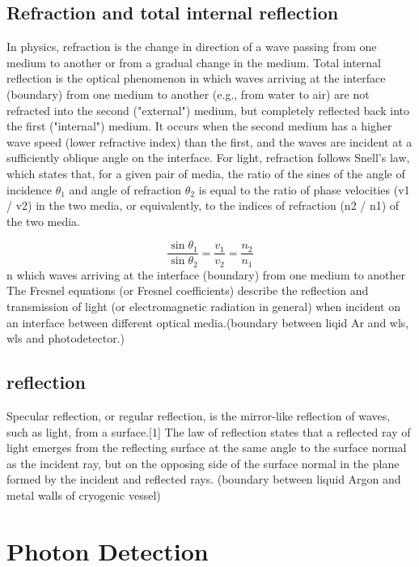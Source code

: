 \documentclass[a4paper]{jpconf}
\begin{document}
  \subsection{Refraction and total internal reflection}
In physics, refraction is the change in direction of a wave passing from one medium to another or from a gradual change in the medium.
Total internal reflection is the optical phenomenon in which waves arriving at the interface (boundary) from one medium to another (e.g., from water to air) are not refracted into the second ("external") medium, but completely reflected back into the first ("internal") medium. It occurs when the second medium has a higher wave speed (lower refractive index) than the first, and the waves are incident at a sufficiently oblique angle on the interface.
For light, refraction follows Snell's law, which states that, for a given pair of media, the ratio of the sines of the angle of incidence $\theta_1$ and angle of refraction $\theta_2$ is equal to the ratio of phase velocities (v1 / v2) in the two media, or equivalently, to the indices of refraction (n2 / n1) of the two media.

  \begin{equation}
    \frac{\sin \theta _{1}}{\sin \theta _{2}}=\frac{v_{1}}{v_{2}}=\frac {n_{2}}{n_{1}}
  \label{equ:snell}
\end{equation}
    n which waves arriving at the interface (boundary) from one medium to another
  The Fresnel equations (or Fresnel coefficients) describe the reflection and transmission of light (or electromagnetic radiation in general) when incident on an interface between different optical media.(boundary between liqid Ar and wls, wls and
  photodetector.)

\subsection{reflection} 
 Specular reflection, or regular reflection, is the mirror-like reflection of waves, such as light, from a surface.[1]
  The law of reflection states that a reflected ray of light emerges from the reflecting surface at the same angle to the surface normal as the incident ray, but on the opposing side of the surface normal in the plane formed by the incident and reflected rays.
  (boundary between liquid  Argon and metal walls of cryogenic vessel)



  
  \clearpage
  \section{Photon Detection}
\end{document}
